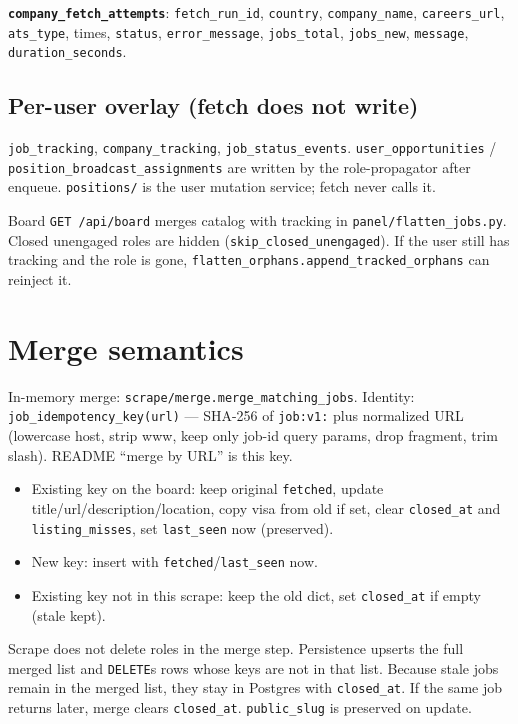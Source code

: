 \documentclass[11pt,a4paper]{article}
\begin{document}
\textbf{\texttt{company\_fetch\_attempts}}: \texttt{fetch\_run\_id},
\texttt{country}, \texttt{company\_name}, \texttt{careers\_url},
\texttt{ats\_type}, times, \texttt{status}, \texttt{error\_message},
\texttt{jobs\_total}, \texttt{jobs\_new}, \texttt{message},
\texttt{duration\_seconds}.

\subsection{Per-user overlay (fetch does not write)}

\texttt{job\_tracking}, \texttt{company\_tracking}, \texttt{job\_status\_events}.
\texttt{user\_opportunities} / \texttt{position\_broadcast\_assignments} are
written by the role-propagator after enqueue. \texttt{positions/} is the user
mutation service; fetch never calls it.

Board \texttt{GET /api/board} merges catalog with tracking in
\texttt{panel/flatten\_jobs.py}. Closed unengaged roles are hidden
(\texttt{skip\_closed\_unengaged}). If the user still has tracking and the role
is gone, \texttt{flatten\_orphans.append\_tracked\_orphans} can reinject it.

\section{Merge semantics}

In-memory merge: \texttt{scrape/merge.merge\_matching\_jobs}. Identity:
\texttt{job\_idempotency\_key(url)} --- SHA-256 of \texttt{job:v1:} plus
normalized URL (lowercase host, strip www, keep only job-id query params,
drop fragment, trim slash). README ``merge by URL'' is this key.

\begin{itemize}
  \item Existing key on the board: keep original \texttt{fetched}, update
        title/url/description/location, copy visa from old if set, clear
        \texttt{closed\_at} and \texttt{listing\_misses}, set
        \texttt{last\_seen} now (preserved).
  \item New key: insert with \texttt{fetched}/\texttt{last\_seen} now.
  \item Existing key not in this scrape: keep the old dict, set
        \texttt{closed\_at} if empty (stale kept).
\end{itemize}

Scrape does not delete roles in the merge step. Persistence upserts the full
merged list and \texttt{DELETE}s rows whose keys are not in that list. Because
stale jobs remain in the merged list, they stay in Postgres with
\texttt{closed\_at}. If the same job returns later, merge clears
\texttt{closed\_at}. \texttt{public\_slug} is preserved on update.
\end{document}
